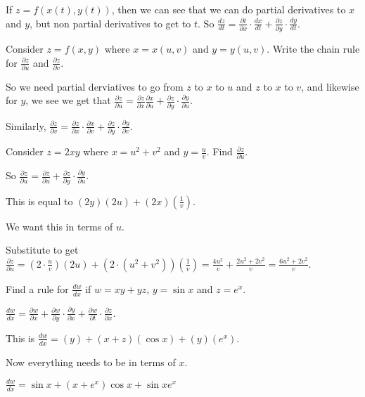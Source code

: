 \documentclass[../calc3.tex]{subfiles}
\begin{document}
If $z=f(x(t),y(t))$, then we can see that we can do partial derivatives to $x$ and $y$, but non partial derivatives to get to $t$. So $\frac{dz}{dt}=\frac{\partial t}{\partial x}\cdot \frac{dx}{dt}+\frac{\partial z}{\partial y}\cdot \frac{dy}{dt}$.

\begin{example}
    Consider $z=f(x,y)$ where $x=x(u,v)$ and $y=y(u,v)$. Write the chain rule for $\frac{\partial z}{\partial u}$ and $\frac{\partial z}{\partial v}$.

    So we need partial derviatives to go from $z$ to $x$ to $u$ and $z$ to $x$ to $v$, and likewise for $y$, we see we get that $\frac{\partial z}{\partial u}=\frac{\partial z}{\partial x}\frac{\partial x}{\partial u}+\frac{\partial z}{\partial y}\cdot \frac{\partial y}{\partial u}$.

    Similarly, $\frac{\partial z}{\partial v}=\frac{\partial z}{\partial x}\cdot \frac{\partial x}{\partial v}+\frac{\partial z}{\partial y}\cdot \frac{\partial y}{\partial v}$.
\end{example}

\begin{example}
    Consider $z=2xy$ where $x=u^2+v^2$ and $y=\frac{u}{v}$. Find $\frac{\partial z}{\partial u}$.

    So $\frac{\partial z}{\partial u}=\frac{\partial z}{\partial u}+\frac{\partial z}{\partial y}\cdot \frac{\partial y}{\partial u}$.

    This is equal to $(2y)(2u)+(2x)\left(\frac{1}{v}\right)$.

    We want this in terms of $u$.

    Substitute to get $\frac{\partial z}{\partial u}=\left(2\cdot \frac{u}{v}\right)(2u)+(2\cdot(u^2+v^2))\left(\frac{1}{v}\right) = \frac{4u^2}{v}+\frac{2u^2+2v^2}{v} = \frac{6u^2+2v^2}{v}$.
\end{example}

\begin{example}
    Find a rule for $\frac{dw}{dx}$ if $w=xy+yz$, $y=\sin x$ and $z=e^x$.

    $\frac{dw}{dx}=\frac{\partial w}{\partial x}+\frac{\partial w}{\partial y}\cdot \frac{\partial y}{\partial x}+\frac{\partial w}{\partial t}\cdot \frac{\partial z}{\partial x}$.

    This is $\frac{dw}{dx}=(y)+(x+z)(\cos x)+(y)(e^x)$.

    Now everything needs to be in terms of $x$.

    $\frac{dw}{dx}=\sin x+(x+e^x)\cos x+\sin x e^x$
\end{example}
\end{document}
